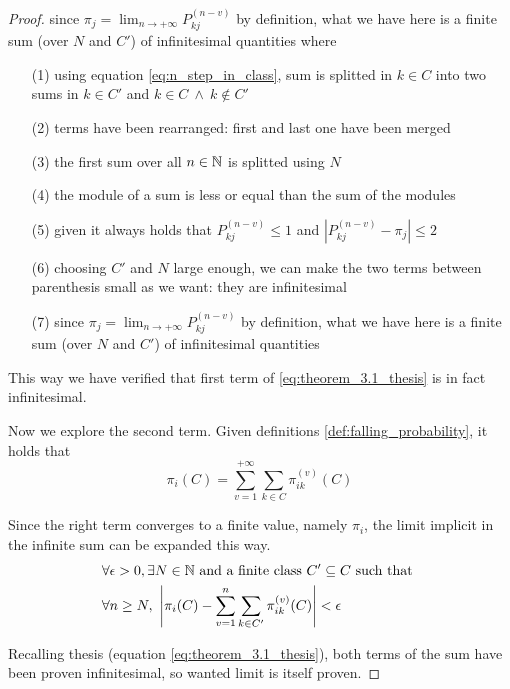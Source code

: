 \begin{proof}
		\setlength{\mathindent}{0cm} %

		since $\pi_j = \lim_{n \to +\infty} P_{kj}^{(n-v)}$ by definition, what we have here is a finite sum (over $N$ and $C'$) of infinitesimal quantities
		where
		\begin{itemize}
			\item [(1)] using equation \eqref{eq:n_step_in_class}, sum is splitted in $k \in C$ into two sums in $k \in C'$ and $k \in C ~ \wedge ~ k \notin C' $
			\item [(2)] terms have been rearranged: first and last one have been merged
			\item [(3)] the first sum over all $n \in \mathbb{N}$ is splitted using $N$
			\item [(4)] the module of a sum is less or equal than the sum of the modules
			\item [(5)] given it always holds that $P_{kj}^{(n-v)} \le 1$ and $|P_{kj}^{(n-v)} - \pi_j| \le 2$
			\item [(6)] choosing $C'$ and $N$ large enough, we can make the two terms between parenthesis small as we want: they are infinitesimal
			\item [(7)] since $\pi_j = \lim_{n \to +\infty} P_{kj}^{(n-v)}$ by definition, what we have here is a finite sum (over $N$ and $C'$) of infinitesimal quantities
		\end{itemize}
		This way we have verified that first term of \eqref{eq:theorem_3.1_thesis} is in fact infinitesimal.

		\bigbreak
		Now we explore the second term.
		Given definitions \ref{def:falling_probability}, it holds that
		$$ \pi_i(C) = \sum_{v = 1}^{+\infty} \sum_{k \in C} \pi_{ik}^{(v)}(C) $$

		\smallbreak
		Since the right term converges to a finite value, namely $\pi_i$, the limit implicit in the infinite sum can be expanded this way.
		\begin{equation}\begin{split} \label{eq:pi_limit_definition}
			& \forall \epsilon > 0, \exists N \in \mathbb{N} \text{ and a finite class } C' \subseteq C \text{ such that } \\
			& \forall n \ge N,~ \left| \pi_i(C) - \sum_{v = 1}^{n} \sum_{k \in C'} \pi_{ik}^{(v)}(C) \right| < \epsilon
		\end{split}\end{equation}

		\bigbreak
		Recalling thesis (equation \eqref{eq:theorem_3.1_thesis}), both terms of the sum have been proven infinitesimal, so wanted limit is itself proven.
	\end{proof}

